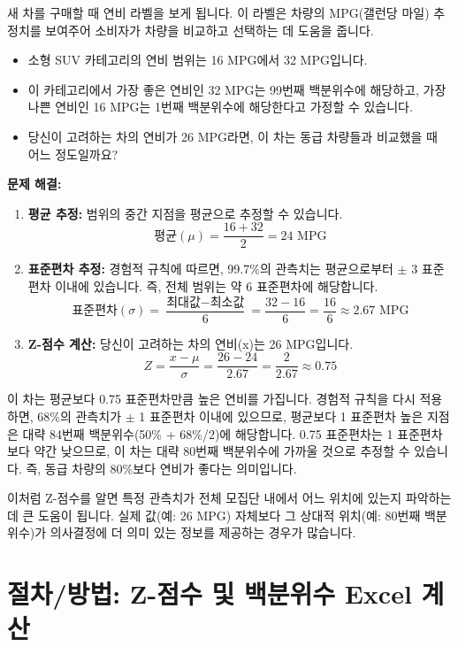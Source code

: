 \documentclass[11pt,a4paper]{book}
\theoremstyle{definition}
\begin{document}
\begin{examplebox}[title=자동차 연비 비교]
새 차를 구매할 때 연비 라벨을 보게 됩니다. 이 라벨은 차량의 MPG(갤런당 마일) 추정치를 보여주어 소비자가 차량을 비교하고 선택하는 데 도움을 줍니다.
\begin{itemize}
    \item 소형 SUV 카테고리의 연비 범위는 16 MPG에서 32 MPG입니다.
    \item 이 카테고리에서 가장 좋은 연비인 32 MPG는 99번째 백분위수에 해당하고, 가장 나쁜 연비인 16 MPG는 1번째 백분위수에 해당한다고 가정할 수 있습니다.
    \item 당신이 고려하는 차의 연비가 26 MPG라면, 이 차는 동급 차량들과 비교했을 때 어느 정도일까요?
\end{itemize}

\textbf{문제 해결:}
\begin{enumerate}
    \item \textbf{평균 추정:} 범위의 중간 지점을 평균으로 추정할 수 있습니다.
    \[ \text{평균} (\mu) = \frac{16 + 32}{2} = 24 \text{ MPG} \]
    \item \textbf{표준편차 추정:} 경험적 규칙에 따르면, 99.7\%의 관측치는 평균으로부터 \(\pm\) 3 표준편차 이내에 있습니다. 즉, 전체 범위는 약 6 표준편차에 해당합니다.
    \[ \text{표준편차} (\sigma) = \frac{\text{최대값} - \text{최소값}}{6} = \frac{32 - 16}{6} = \frac{16}{6} \approx 2.67 \text{ MPG} \]
    \item \textbf{Z-점수 계산:} 당신이 고려하는 차의 연비(x)는 26 MPG입니다.
    \[ Z = \frac{x - \mu}{\sigma} = \frac{26 - 24}{2.67} = \frac{2}{2.67} \approx 0.75 \]
\end{enumerate}
이 차는 평균보다 0.75 표준편차만큼 높은 연비를 가집니다. 경험적 규칙을 다시 적용하면, 68\%의 관측치가 \(\pm\) 1 표준편차 이내에 있으므로, 평균보다 1 표준편차 높은 지점은 대략 84번째 백분위수(50\% + 68\%/2)에 해당합니다. 0.75 표준편차는 1 표준편차보다 약간 낮으므로, 이 차는 대략 80번째 백분위수에 가까울 것으로 추정할 수 있습니다. 즉, 동급 차량의 80\%보다 연비가 좋다는 의미입니다.

이처럼 Z-점수를 알면 특정 관측치가 전체 모집단 내에서 어느 위치에 있는지 파악하는 데 큰 도움이 됩니다. 실제 값(예: 26 MPG) 자체보다 그 상대적 위치(예: 80번째 백분위수)가 의사결정에 더 의미 있는 정보를 제공하는 경우가 많습니다.
\end{examplebox}


\section{절차/방법: Z-점수 및 백분위수 Excel 계산}
\end{document}
